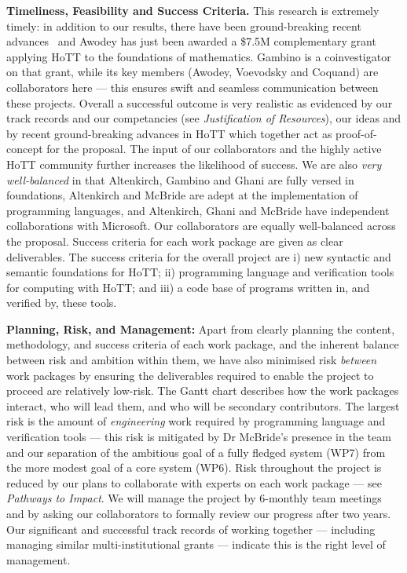 \documentclass[a4paper,11pt]{article}
\begin{document}
{\bf Timeliness, Feasibility and Success Criteria.}  This research is
extremely timely: in addition to our results, there have been
ground-breaking recent advances~\cite{ShulmanM:uniidh,BezemM:cubsmt, nominal} and Awodey has just
been awarded a \$7.5M complementary grant applying HoTT to the
foundations of mathematics. Gambino is a coinvestigator on that grant,
while its key members (Awodey, Voevodsky and Coquand) are
collaborators here --- this ensures swift and seamless communication
between these projects.  Overall a successful outcome is very realistic
as evidenced by our track records and our competancies (see {\em
  Justification of Resources}), our ideas and by recent 
ground-breaking advances in HoTT which together act as
proof-of-concept for the proposal. The input of our collaborators and
the highly active HoTT community further increases the likelihood of
success. We are also {\em very well-balanced} in that Altenkirch,
Gambino and Ghani are fully versed in foundations, Altenkirch and
McBride are adept at the implementation of programming languages, and
Altenkirch, Ghani and McBride have independent collaborations with Microsoft. Our
collaborators are equally well-balanced across the 
proposal. Success criteria for each work package are given as clear
deliverables. The success criteria for the overall project are i) new
syntactic and semantic foundations for HoTT; ii) programming language
and verification tools for computing with HoTT; and iii) a code base
of programs written in, and verified by, these tools.  


{\bf Planning, Risk, and Management:} Apart from clearly
planning the content, methodology, and success criteria of each work package,
and the inherent balance between risk and ambition
within them, we have also minimised risk {\em between} work packages
by ensuring the deliverables required to enable the project to proceed 
are relatively low-risk. The Gantt chart describes how the work
packages interact, who will lead them, and who will be secondary
contributors. The largest risk is the 
amount of {\em engineering} work required by programming language
and verification tools --- this risk is mitigated by Dr McBride's
presence in the team and our 
separation of the ambitious
goal of a fully fledged system (WP7) from the more modest
goal of a core system (WP6). Risk throughout the project is reduced by
our plans to collaborate
with experts on each work package --- see {\em Pathways to Impact}. We
will manage the project by 6-monthly team meetings and by asking our
collaborators to formally review our progress after two years.  Our
significant and successful track records of working together ---
including managing similar multi-institutional grants --- indicate
this is the right level of management.
\end{document}
